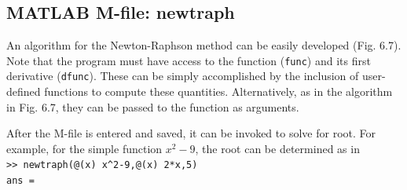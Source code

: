 \documentclass[../main.tex]{subfiles}
\begin{document}
\subsection{MATLAB M-file: newtraph}
\noindent An algorithm for the Newton-Raphson method can be easily developed (Fig. 6.7). Note that
the program must have access to the function (\texttt{func}) and its first derivative (\texttt{dfunc}). These
can be simply accomplished by the inclusion of user-defined functions to compute these
quantities. Alternatively, as in the algorithm in Fig. 6.7, they can be passed to the function
as arguments.

After the M-file is entered and saved, it can be invoked to solve for root. For example,
for the simple function $x^2 - 9$, the root can be determined as in\\

\texttt{>> newtraph(@(x) x\textasciicircum2-9,@(x) 2*x,5)\\
\indent ans =\\
\indent{}\\}
\end{document}
